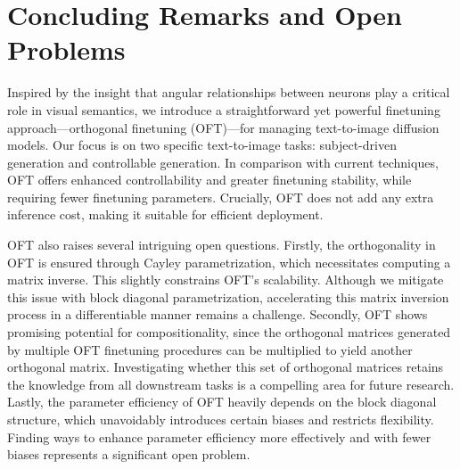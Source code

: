 \section{Concluding Remarks and Open Problems}

Inspired by the insight that angular relationships between neurons play a critical role in visual semantics, we introduce a straightforward yet powerful finetuning approach—orthogonal finetuning (OFT)—for managing text-to-image diffusion models. Our focus is on two specific text-to-image tasks: subject-driven generation and controllable generation. In comparison with current techniques, OFT offers enhanced controllability and greater finetuning stability, while requiring fewer finetuning parameters. Crucially, OFT does not add any extra inference cost, making it suitable for efficient deployment.

OFT also raises several intriguing open questions. Firstly, the orthogonality in OFT is ensured through Cayley parametrization, which necessitates computing a matrix inverse. This slightly constrains OFT's scalability. Although we mitigate this issue with block diagonal parametrization, accelerating this matrix inversion process in a differentiable manner remains a challenge. Secondly, OFT shows promising potential for compositionality, since the orthogonal matrices generated by multiple OFT finetuning procedures can be multiplied to yield another orthogonal matrix. Investigating whether this set of orthogonal matrices retains the knowledge from all downstream tasks is a compelling area for future research. Lastly, the parameter efficiency of OFT heavily depends on the block diagonal structure, which unavoidably introduces certain biases and restricts flexibility. Finding ways to enhance parameter efficiency more effectively and with fewer biases represents a significant open problem. 

